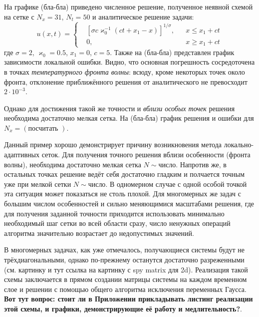 На графике (бла-бла) приведено численное решение, полученное неявной схемой на сетке с $N_x = 31$, $N_t = 50$ и аналитическое решение задачи:
\begin{equation*}
    u(x, t) = \left\{
        \begin{aligned}
            &\left[ \sigma c\varkappa_0^{-1} (ct + x_1 - x) \right]^{1/\sigma}, && x \le x_1 + ct\\
            &0, && x \ge x_1 + ct
        \end{aligned}
    \right.
\end{equation*}
где $\sigma = 2$, $\varkappa_0 = 0.5$, $x_1 = 0$, $c = 5$. 
Также на (бла-бла) представлен график зависимости локальной ошибки.
Видно, что основная погрешность сосредоточена в точках \emph{температурного фронта волны}: всюду, кроме некоторых точек около фронта, отклонение приближённого решения от аналитического не превосходит $2\cdot 10^{-3}$.

Однако для достижения такой же точности и \emph{вблизи особых точек} решения необходима достаточно мелкая сетка.
На (бла-бла) график решения и ошибки для $N_x = (\text{посчитать    })$.

Данный пример хорошо демонстрирует причину возникновения метода локально-адаптивных сеток.
Для получения точного решения вблизи особенности (фронта волны), необходима достаточно мелкая сетка $N \sim \text{число}$.
Напротив же, в остальных точках решение ведёт себя достаточно гладким и полчается точным уже при мелкой сетки $N \sim \text{число}$.
В одномерном случае с одной особой точкой эта ситуация может показаться не столь плохой.
Для многомерных же задач с большим числом особенностей и сильно меняющимися масштабами решения, где для получения заданной точности приходится использовать минимально необходимый шаг сетки во всей области сразу, число ненужных операций алгоритма значительно возрастает до недопустимых значений. 

В многомерных задачах, как уже отмечалось, получающиеся системы будут не трёхдиагональными, однако по-прежнему останутся достаточно разреженными (см. картинку и тут ссылка на картинку с spy matrix для 2d).
Реализация такой схемы заключается в прямом создании матрицы системы на каждом временном слое и решении с помощью общего алгоритма исключения переменных Гаусса.
\textbf{Вот тут вопрос: стоит ли в Приложении прикладывать листинг реализации этой схемы, и графики, демонстрирующие её работу и медлительность?}.

